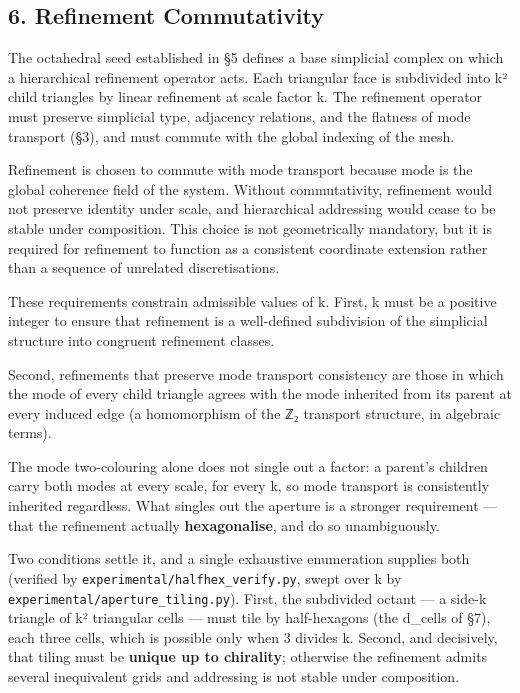 \documentclass[
  11pt,
  a4paper,
]{article}
\begin{document}
\subsection{6. Refinement Commutativity}\label{refinement-commutativity}

The octahedral seed established in §5 defines a base simplicial complex
on which a hierarchical refinement operator acts. Each triangular face
is subdivided into k² child triangles by linear refinement at scale
factor k. The refinement operator must preserve simplicial type,
adjacency relations, and the flatness of mode transport (§3), and must
commute with the global indexing of the mesh.

Refinement is chosen to commute with mode transport because mode is the
global coherence field of the system. Without commutativity, refinement
would not preserve identity under scale, and hierarchical addressing
would cease to be stable under composition. This choice is not
geometrically mandatory, but it is required for refinement to function
as a consistent coordinate extension rather than a sequence of unrelated
discretisations.

These requirements constrain admissible values of k. First, k must be a
positive integer to ensure that refinement is a well-defined subdivision
of the simplicial structure into congruent refinement classes.

Second, refinements that preserve mode transport consistency are those
in which the mode of every child triangle agrees with the mode inherited
from its parent at every induced edge (a homomorphism of the ℤ₂
transport structure, in algebraic terms).

The mode two-colouring alone does not single out a factor: a parent's
children carry both modes at every scale, for every k, so mode transport
is consistently inherited regardless. What singles out the aperture is a
stronger requirement --- that the refinement actually
\textbf{hexagonalise}, and do so unambiguously.

Two conditions settle it, and a single exhaustive enumeration supplies
both (verified by \texttt{experimental/halfhex\_verify.py}, swept over k
by \texttt{experimental/aperture\_tiling.py}). First, the subdivided
octant --- a side-k triangle of k² triangular cells --- must tile by
half-hexagons (the d\_cells of §7), each three cells, which is possible
only when 3 divides k. Second, and decisively, that tiling must be
\textbf{unique up to chirality}; otherwise the refinement admits several
inequivalent grids and addressing is not stable under composition.
\end{document}
